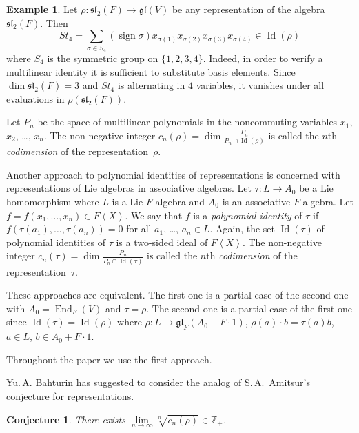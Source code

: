 \documentclass[12pt, reqno, a4paper]{amsart}
\theoremstyle{plain}
\newtheorem*{conjecture}{Conjecture}
\theoremstyle{remark}
\theoremstyle{definition}
\newtheorem{example}{Example}
\begin{document}
\begin{example}
Let $\rho \colon \mathfrak{sl}_2(F) \to \mathfrak{gl}(V)$
be any representation of the algebra $\mathfrak{sl}_2(F)$.
Then $$St_4=\sum_{\sigma \in S_4} (\operatorname{sign} \sigma)x_{\sigma(1)} x_{\sigma(2)}
x_{\sigma(3)} x_{\sigma(4)} \in \operatorname{Id}(\rho)$$
where $S_4$ is the symmetric group on $\lbrace 1, 2, 3, 4\rbrace$.
Indeed, in order to verify a multilinear identity
it is sufficient to substitute basis elements.
Since $\dim\mathfrak{sl}_2(F)=3$ and $St_4$
is alternating in $4$ variables, it vanishes under all
evaluations in $\rho(\mathfrak{sl}_2(F))$.
\end{example}

Let $P_n$ be the space of multilinear polynomials
in the noncommuting variables $x_1$, $x_2$, \ldots,
$x_n$. The non-negative integer
 $c_n(\rho) = \dim \frac {P_n}{P_n \cap \operatorname{Id}(\rho)}$
is called the $n$th {\itshape codimension} of the representation~$\rho$.

Another approach to polynomial identities of representations is concerned with representations of Lie algebras in associative algebras.
 Let $\tau \colon L \to A_0$ be a Lie homomorphism where $L$ is a Lie $F$-algebra and $A_0$ is an associative
$F$-algebra. Let
$f=f(x_1,\ldots,x_n) \in F\left<  X \right>$.
We say that $f$ is
a \textit{polynomial identity} of $\tau$ if $f(\tau(a_1), \ldots, \tau(a_n))=0$
for all $a_1$, \ldots, $a_n \in L$.
  Again, the set $\operatorname{Id}(\tau)$ of polynomial identities of $\tau$ is
a two-sided ideal of $F \left<  X \right>$.
The non-negative integer
 $c_n(\tau) = \dim \frac {P_n}{P_n \cap \operatorname{Id}(\tau)}$
is called the $n$th {\itshape codimension} of the representation~$\tau$.

These approaches are equivalent. The first one is a partial case of the second one with $A_0 = \operatorname{End}_F(V)$
and $\tau = \rho$.
The second one is a partial case of the first one since $\operatorname{Id}(\tau) = \operatorname{Id}(\rho)$ where
$\rho \colon L \to \mathfrak{gl}_F (A_0 + F \cdot 1)$,
 $\rho(a) \cdot b=\tau(a)b$, $a \in L$, $b \in A_0 + F \cdot 1$.

 Throughout the paper we use the first approach.

Yu.\,A. Bahturin has suggested to consider the analog of S.\,A.~Amitsur's conjecture
for representations.

\begin{conjecture} There exists
 $\lim\limits_{n\to\infty} \sqrt[n]{c_n(\rho)} \in \mathbb Z_+$.
\end{conjecture}
\end{document}
